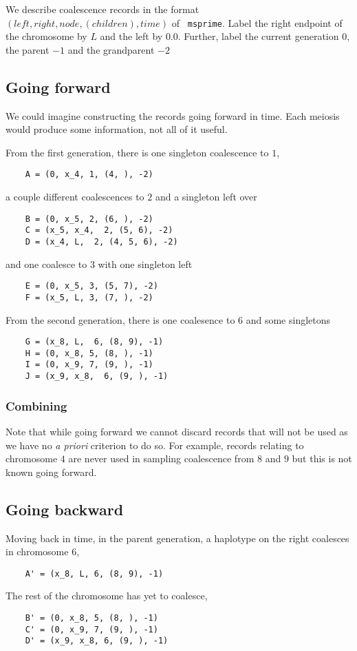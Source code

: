 \documentclass[12pt]{article}
\begin{document}

We describe coalescence records in the format $(left, right, node, (children), time)$ of {\tt
	msprime}.
Label the right endpoint of the chromosome by $L$ and the left by
$0.0$. Further, label the current generation $0$, the parent $-1$ and the
grandparent $-2$

\subsection*{Going forward}

We could imagine constructing the records going forward in time.
Each meiosis would produce some information, not all of it useful.

From the first generation, there is one singleton coalescence to $1$,
\begin{verbatim}
	A = (0, x_4, 1, (4, ), -2)
\end{verbatim}
a couple different coalescences to $2$ and a singleton left over
\begin{verbatim}
	B = (0, x_5, 2, (6, ), -2)
	C = (x_5, x_4,  2, (5, 6), -2)
	D = (x_4, L,  2, (4, 5, 6), -2)
\end{verbatim}
and one coalesce to $3$ with one singleton left
\begin{verbatim}
	E = (0, x_5, 3, (5, 7), -2)
	F = (x_5, L, 3, (7, ), -2)
\end{verbatim}

From the second generation, there is one coalesence to $6$ and some singletons
\begin{verbatim}
	G = (x_8, L,  6, (8, 9), -1)
	H = (0, x_8, 5, (8, ), -1)
	I = (0, x_9, 7, (9, ), -1)
	J = (x_9, x_8,  6, (9, ), -1)
\end{verbatim}

\subsubsection*{Combining}

Note that while going forward  we cannot discard records that will not be used
as we have no {\it a priori}  criterion to do so.  For example, records relating
to chromosome $4$ are never used in sampling coalescence from $8$ and $9$ but
this is not known going forward.

\subsection*{Going backward}
Moving back in time, in the parent generation, a haplotype on the right coalesces
in chromosome $6$,
\begin{verbatim}
	A' = (x_8, L, 6, (8, 9), -1)
\end{verbatim}
The rest of the chromosome has yet to coalesce,
\begin{verbatim}
	B' = (0, x_8, 5, (8, ), -1)
	C' = (0, x_9, 7, (9, ), -1)
	D' = (x_9, x_8, 6, (9, ), -1)
\end{verbatim}
\end{document}
